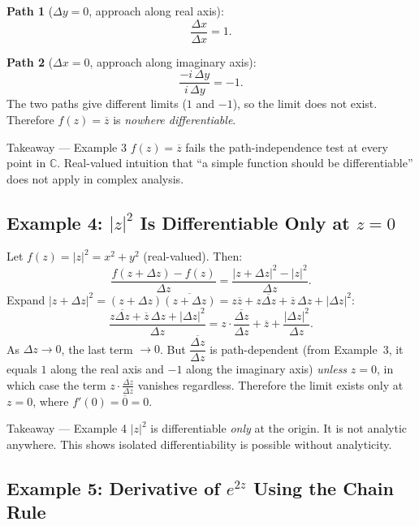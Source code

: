 \documentclass[12pt,a4paper]{article}
\begin{document}
\textbf{Path 1} ($\Delta y = 0$, approach along real axis):
\[
  \frac{\Delta x}{\Delta x} = 1.
\]

\textbf{Path 2} ($\Delta x = 0$, approach along imaginary axis):
\[
  \frac{-i\,\Delta y}{i\,\Delta y} = -1.
\]
The two paths give different limits ($1$ and $-1$), so the limit does not exist.
Therefore $f(z) = \overline{z}$ is \emph{nowhere differentiable}.

\begin{learnbox}{Takeaway --- Example 3}
$f(z) = \overline{z}$ fails the path-independence test at every point in $\mathbb{C}$.
Real-valued intuition that ``a simple function should be differentiable'' does not
apply in complex analysis.
\end{learnbox}

\subsection*{Example 4: $|z|^2$ Is Differentiable Only at $z = 0$}

Let $f(z) = |z|^2 = x^2 + y^2$ (real-valued). Then:
\[
  \frac{f(z+\Delta z)-f(z)}{\Delta z}
  = \frac{|z+\Delta z|^2 - |z|^2}{\Delta z}.
\]
Expand $|z+\Delta z|^2 = (z+\Delta z)\overline{(z+\Delta z)}
= z\overline{z} + z\overline{\Delta z} + \overline{z}\,\Delta z + |\Delta z|^2$:
\[
  \frac{z\overline{\Delta z} + \overline{z}\,\Delta z + |\Delta z|^2}{\Delta z}
  = z \cdot \frac{\overline{\Delta z}}{\Delta z} + \overline{z} + \frac{|\Delta z|^2}{\Delta z}.
\]
As $\Delta z \to 0$, the last term $\to 0$. But $\dfrac{\overline{\Delta z}}{\Delta z}$ is
path-dependent (from Example~3, it equals $1$ along the real axis and $-1$ along the
imaginary axis) \emph{unless} $z = 0$, in which case the term $z\cdot\frac{\overline{\Delta z}}{\Delta z}$
vanishes regardless. Therefore the limit exists only at $z = 0$, where $f'(0) = \overline{0} = 0$.

\begin{learnbox}{Takeaway --- Example 4}
$|z|^2$ is differentiable \emph{only} at the origin. It is not analytic anywhere.
This shows isolated differentiability is possible without analyticity.
\end{learnbox}

\subsection*{Example 5: Derivative of $e^{2z}$ Using the Chain Rule}
\end{document}
